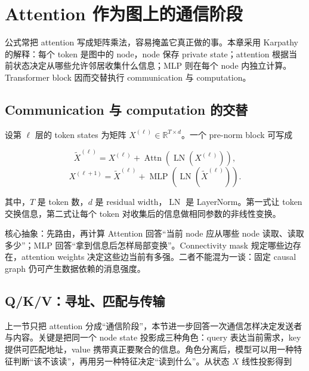 \section{Attention 作为图上的通信阶段}

公式常把 attention 写成矩阵乘法，容易掩盖它真正做的事。本章采用 Karpathy 的解释：每个 token 是图中的 node，node 保存 private state；attention 根据当前状态决定从哪些允许邻居收集什么信息；MLP 则在每个 node 内独立计算。Transformer block 因而交替执行 communication 与 computation。

\subsection{Communication 与 computation 的交替}

设第 $\ell$ 层的 token states 为矩阵 $X^{(\ell)}\in\mathbb R^{T\times d}$。一个 pre-norm block 可写成

\[
\widetilde X^{(\ell)}=X^{(\ell)}+\operatorname{Attn}(\operatorname{LN}(X^{(\ell)})),
\]
\[
X^{(\ell+1)}=\widetilde X^{(\ell)}+\operatorname{MLP}(\operatorname{LN}(\widetilde X^{(\ell)})).
\]

其中，$T$ 是 token 数，$d$ 是 residual width，$\operatorname{LN}$ 是 LayerNorm。第一式让 token 交换信息，第二式让每个 token 对收集后的信息做相同参数的非线性变换。


\begin{importantbox}{核心抽象：先路由，再计算}
Attention 回答“当前 node 应从哪些 node 读取、读取多少”；MLP 回答“拿到信息后怎样局部变换”。Connectivity mask 规定哪些边存在，attention weights 决定这些边当前有多强。二者不能混为一谈：固定 causal graph 仍可产生数据依赖的消息强度。
\end{importantbox}

\subsection{Q/K/V：寻址、匹配与传输}

上一节只把 attention 分成“通信阶段”，本节进一步回答一次通信怎样决定发送者与内容。关键是把同一个 node state 投影成三种角色：query 表达当前需求，key 提供可匹配地址，value 携带真正要聚合的信息。角色分离后，模型可以用一种特征判断“该不该读”，再用另一种特征决定“读到什么”。从状态 $X$ 线性投影得到

